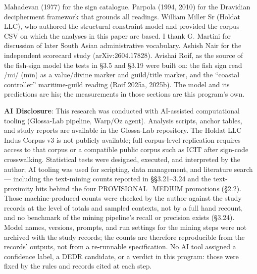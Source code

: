 \documentclass[11pt]{article}
\begin{document}
Mahadevan (1977) for the
sign catalogue. Parpola (1994, 2010) for the Dravidian decipherment
framework that grounds all readings. William Miller Sr (Holdat LLC), who authored the structural constraint model and provided the corpus CSV on which the analyses in this paper are based. I thank G. Martini for discussion of later South Asian administrative vocabulary.
Ashish Nair for the independent scorecard study (arXiv:2604.17828).
Avishai Roif, as the source of the fish-sign model the tests in
\S3.5 and \S3.19 were built on: the fish sign read /mi/ (m\={i}n)
as a value/divine marker and guild/title marker, and the
``coastal controller'' maritime-guild reading (Roif 2025a, 2025b).
The model and its predictions are his; the measurements in those
sections are this program's own.

\textbf{AI Disclosure}: This research was conducted with AI-assisted
computational tooling (Glossa-Lab pipeline, Warp/Oz agent). Analysis scripts, anchor tables, and study reports are available in the Glossa-Lab repository. The Holdat LLC Indus Corpus v3 is not publicly available; full corpus-level replication requires access to that corpus or a compatible public corpus such as ICIT after sign-code crosswalking. Statistical tests were designed, executed, and interpreted by the author; AI tooling was used for scripting, data management, and literature search --- including the text-mining counts reported in §§3.21--3.24 and the text-proximity hits behind the four PROVISIONAL\_MEDIUM promotions (§2.2). Those machine-produced counts were checked by the author against the study records at the level of totals and sampled contexts, not by a full hand recount, and no benchmark of the mining pipeline's recall or precision exists (§3.24). Model names, versions, prompts, and run settings for the mining steps were not archived with the study records; the counts are therefore reproducible from the records' outputs, not from a re-runnable specification. No AI tool assigned a confidence label, a DEDR candidate, or a verdict in this program: those were fixed by the rules and records cited at each step.
\end{document}
